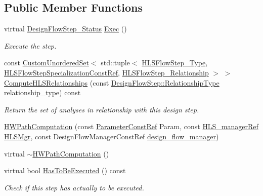 \subsection*{Public Member Functions}
\begin{DoxyCompactItemize}
\item 
virtual \hyperlink{design__flow__step_8hpp_afb1f0d73069c26076b8d31dbc8ebecdf}{Design\+Flow\+Step\+\_\+\+Status} \hyperlink{classHWPathComputation_add5efabc2eea4a6167863ceca3c50b0e}{Exec} ()
\begin{DoxyCompactList}\small\item\em Execute the step. \end{DoxyCompactList}\item 
const \hyperlink{classCustomUnorderedSet}{Custom\+Unordered\+Set}$<$ std\+::tuple$<$ \hyperlink{hls__step_8hpp_ada16bc22905016180e26fc7e39537f8d}{H\+L\+S\+Flow\+Step\+\_\+\+Type}, \hyperlink{hls__step_8hpp_a5fdd2edf290c196531d21d68e13f0e74}{H\+L\+S\+Flow\+Step\+Specialization\+Const\+Ref}, \hyperlink{hls__step_8hpp_a3ad360b9b11e6bf0683d5562a0ceb169}{H\+L\+S\+Flow\+Step\+\_\+\+Relationship} $>$ $>$ \hyperlink{classHWPathComputation_ace7b922eaba88a8247ff44dd25ae3dbe}{Compute\+H\+L\+S\+Relationships} (const \hyperlink{classDesignFlowStep_a723a3baf19ff2ceb77bc13e099d0b1b7}{Design\+Flow\+Step\+::\+Relationship\+Type} relationship\+\_\+type) const
\begin{DoxyCompactList}\small\item\em Return the set of analyses in relationship with this design step. \end{DoxyCompactList}\item 
\hyperlink{classHWPathComputation_ad45b629abcebedfa77f1dd088e338ea8}{H\+W\+Path\+Computation} (const \hyperlink{Parameter_8hpp_a37841774a6fcb479b597fdf8955eb4ea}{Parameter\+Const\+Ref} Param, const \hyperlink{hls__manager_8hpp_acd3842b8589fe52c08fc0b2fcc813bfe}{H\+L\+S\+\_\+manager\+Ref} \hyperlink{classHLS__step_ade85003a99d34134418451ddc46a18e9}{H\+L\+S\+Mgr}, const Design\+Flow\+Manager\+Const\+Ref \hyperlink{classDesignFlowStep_ab770677ddf087613add30024e16a5554}{design\+\_\+flow\+\_\+manager})
\item 
virtual \hyperlink{classHWPathComputation_a688fdb4a23c881a0dd23f6582182a637}{$\sim$\+H\+W\+Path\+Computation} ()
\item 
virtual bool \hyperlink{classHWPathComputation_a0a9a812ed694880508c509a63c03fb26}{Has\+To\+Be\+Executed} () const
\begin{DoxyCompactList}\small\item\em Check if this step has actually to be executed. \end{DoxyCompactList}\end{DoxyCompactItemize}

